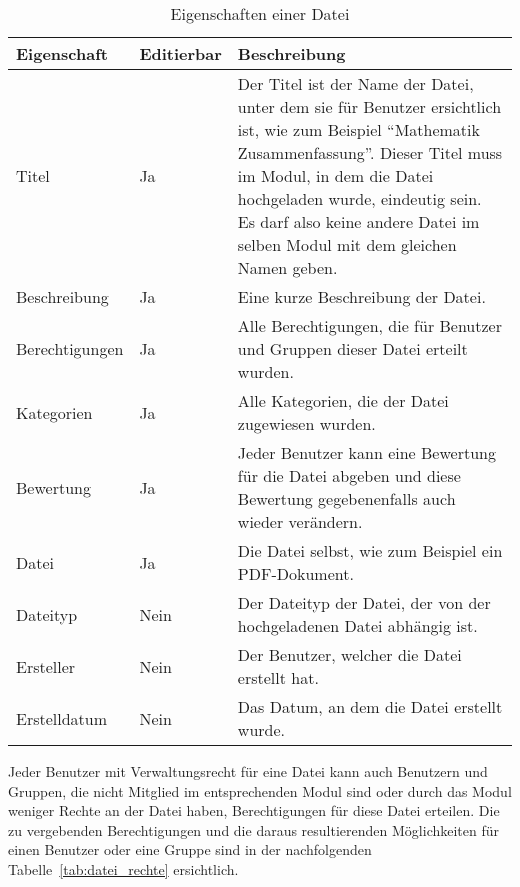 \begin{table}[H]
\begin{tabularx}{\textwidth}{|l|l|X|} \hline
\textbf{Eigenschaft} &\textbf{Editierbar} & \textbf{Beschreibung} \\ \hline
Titel				& Ja 	& Der Titel ist der Name der Datei, unter dem sie für Benutzer ersichtlich ist, wie zum Beispiel “Mathematik Zusammenfassung”. Dieser Titel muss im Modul, in dem die Datei hochgeladen wurde, eindeutig sein. Es darf also keine andere Datei im selben Modul mit dem gleichen Namen geben.\\ \hline
Beschreibung		& Ja 	& Eine kurze Beschreibung der Datei.\\ \hline
Berechtigungen		& Ja 	& Alle Berechtigungen, die für Benutzer und Gruppen dieser Datei erteilt wurden.\\ \hline
Kategorien			& Ja 	& Alle Kategorien, die der Datei zugewiesen wurden.\\ \hline
Bewertung			& Ja	& Jeder Benutzer kann eine Bewertung für die Datei abgeben und diese Bewertung gegebenenfalls auch wieder verändern.\\ \hline
Datei 				& Ja	& Die Datei selbst, wie zum Beispiel ein PDF-Dokument.\\ \hline
Dateityp			& Nein	& Der Dateityp der Datei, der von der hochgeladenen Datei abhängig ist.\\ \hline
Ersteller	 		& Nein 	& Der Benutzer, welcher die Datei erstellt hat.\\ \hline
Erstelldatum		& Nein 	& Das Datum, an dem die Datei erstellt wurde.\\ \hline
\end{tabularx}
\caption{Eigenschaften einer Datei}
\label{tab:datei_eigenschaften}
\end{table}

Jeder Benutzer mit Verwaltungsrecht für eine Datei kann auch Benutzern und Gruppen, die nicht Mitglied im entsprechenden Modul sind oder durch das Modul weniger Rechte an der Datei haben, Berechtigungen für diese Datei erteilen. Die zu vergebenden Berechtigungen und die daraus resultierenden Möglichkeiten für einen Benutzer oder eine Gruppe sind in der nachfolgenden Tabelle~\ref{tab:datei_rechte} ersichtlich.


